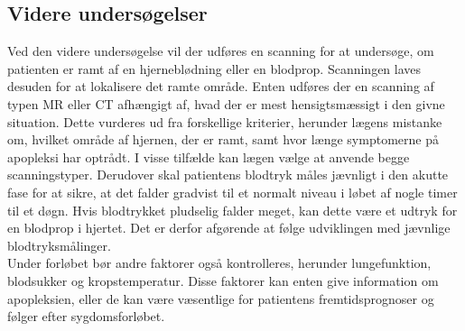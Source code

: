 \subsection{Videre undersøgelser}
Ved den videre undersøgelse vil der udføres en scanning for at undersøge, om patienten er ramt af en hjerneblødning  eller en blodprop. Scanningen laves desuden for at lokalisere det ramte område. Enten udføres der en scanning af typen MR eller CT afhængigt af, hvad der er mest hensigtsmæssigt i den givne situation. Dette vurderes ud fra forskellige kriterier, herunder lægens mistanke om, hvilket område af hjernen, der er ramt, samt hvor længe symptomerne på apopleksi har optrådt. I visse tilfælde kan lægen vælge at anvende begge scanningstyper.  
Derudover skal patientens blodtryk måles jævnligt i den akutte fase for at sikre, at det falder gradvist til et normalt niveau i løbet af nogle timer til et døgn. Hvis blodtrykket pludselig falder meget, kan dette være et udtryk for en blodprop i hjertet. Det er derfor afgørende at følge udviklingen med jævnlige blodtryksmålinger. \citep{Sundhedsstyrelsen2009}
\\
Under forløbet bør andre faktorer også kontrolleres, herunder lungefunktion, blodsukker og kropstemperatur. Disse faktorer kan enten give information om apopleksien, eller de kan være væsentlige for patientens fremtidsprognoser og følger efter sygdomsforløbet. \citep{Sundhedsstyrelsen2009}
\\

